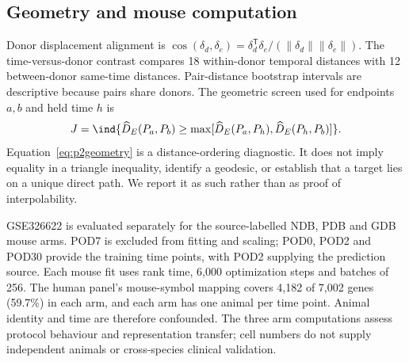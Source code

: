 \documentclass[10pt,a4paper]{article}
\begin{document}
\subsection{Geometry and mouse computation}
Donor displacement alignment is $\cos(\delta_d,\delta_e)=\delta_d^{\mathsf T}\delta_e/(\|\delta_d\|\|\delta_e\|)$. The time-versus-donor contrast compares 18 within-donor temporal distances with 12 between-donor same-time distances. Pair-distance bootstrap intervals are descriptive because pairs share donors. The geometric screen used for endpoints $a,b$ and held time $h$ is
\begin{equation}
J=\ind\{\widehat D_E(P_a,P_b)\geq\max[\widehat D_E(P_a,P_h),\widehat D_E(P_h,P_b)]\}.\label{eq:p2geometry}
\end{equation}
Equation~\eqref{eq:p2geometry} is a distance-ordering diagnostic. It does not imply equality in a triangle inequality, identify a geodesic, or establish that a target lies on a unique direct path. We report it as such rather than as proof of interpolability.

GSE326622 \citep{berryman2026mechanotransduction} is evaluated separately for the source-labelled NDB, PDB and GDB mouse arms. POD7 is excluded from fitting and scaling; POD0, POD2 and POD30 provide the training time points, with POD2 supplying the prediction source. Each mouse fit uses rank time, 6,000 optimization steps and batches of 256. The human panel's mouse-symbol mapping covers 4,182 of 7,002 genes (59.7\%) in each arm, and each arm has one animal per time point. Animal identity and time are therefore confounded. The three arm computations assess protocol behaviour and representation transfer; cell numbers do not supply independent animals or cross-species clinical validation.
\end{document}
